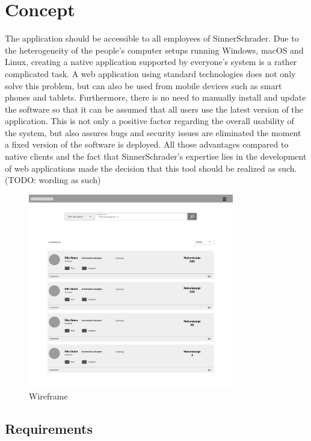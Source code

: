 \chapter{Concept}
The application should be accessible to all employees of SinnerSchrader. Due to the heterogeneity of the people’s computer setups running Windows, macOS and Linux, creating a native application supported by everyone’s system is a rather complicated task. A web application using standard technologies does not only solve this problem, but can also be used from mobile devices such as smart phones and tablets. Furthermore, there is no need to manually install and update the software so that it can be assumed that all users use the latest version of the application. This is not only a positive factor regarding the overall usability of the system, but also assures bugs and security issues are eliminated the moment a fixed version of the software is deployed. All those advantages compared to native clients and the fact that SinnerSchrader’s expertise lies in the development of web applications made the decision that this tool should be realized as such. (TODO: wording as such)

\begin{figure}[h]
    \centering
    \includegraphics[width=0.8\textwidth]{images/wireframe.png}
    \caption{Wireframe}
    \label{fig:wireframe}
\end{figure}


\section{Requirements}
